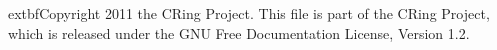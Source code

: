 \documentclass{book}
\begin{document}
\tableofcontents

	extbf{Copyright 2011 the CRing Project. This file is part of the CRing Project, which is released under the GNU Free Documentation License, Version 1.2.}

\setcounter{chapter}{4}


\end{document}
